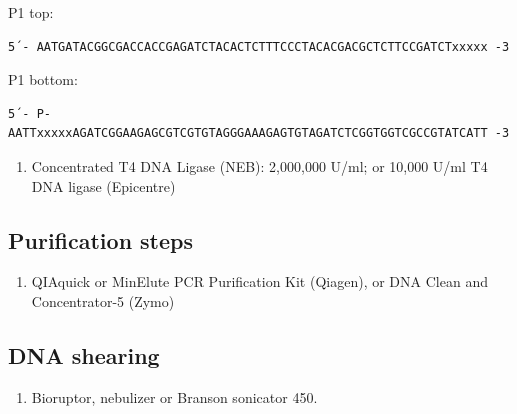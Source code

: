\documentclass[
  letterpaper,
  DIV=11,
  numbers=noendperiod]{scrreprt}
\providecommand{\tightlist}{%
  \setlength{\itemsep}{0pt}\setlength{\parskip}{0pt}}\usepackage{longtable,booktabs,array}
\begin{document}
\begin{tcolorbox}[enhanced jigsaw, rightrule=.15mm, title=\textcolor{quarto-callout-warning-color}{\faExclamationTriangle}\hspace{0.5em}{NOTES}, titlerule=0mm, opacitybacktitle=0.6, toprule=.15mm, bottomrule=.15mm, opacityback=0, left=2mm, colframe=quarto-callout-warning-color-frame, breakable, coltitle=black, colback=white, colbacktitle=quarto-callout-warning-color!10!white, bottomtitle=1mm, leftrule=.75mm, toptitle=1mm, arc=.35mm]

P1 top:

\begin{verbatim}
5´- AATGATACGGCGACCACCGAGATCTACACTCTTTCCCTACACGACGCTCTTCCGATCTxxxxx -3
\end{verbatim}

P1 bottom:

\begin{verbatim}
5´- P-AATTxxxxxAGATCGGAAGAGCGTCGTGTAGGGAAAGAGTGTAGATCTCGGTGGTCGCCGTATCATT -3
\end{verbatim}

\end{tcolorbox}

\begin{enumerate}
\def\labelenumi{\arabic{enumi}.}
\setcounter{enumi}{3}
\tightlist
\item
  Concentrated T4 DNA Ligase (NEB): 2,000,000 U/ml; or 10,000 U/ml T4
  DNA ligase (Epicentre)
\end{enumerate}

\hypertarget{purification-steps}{%
\subsection{Purification steps}\label{purification-steps}}

\begin{enumerate}
\def\labelenumi{\arabic{enumi}.}
\tightlist
\item
  QIAquick or MinElute PCR Purification Kit (Qiagen), or DNA Clean and
  Concentrator-5 (Zymo)
\end{enumerate}

\hypertarget{dna-shearing}{%
\subsection{DNA shearing}\label{dna-shearing}}

\begin{enumerate}
\def\labelenumi{\arabic{enumi}.}
\tightlist
\item
  Bioruptor, nebulizer or Branson sonicator 450.
\end{enumerate}
\end{document}
